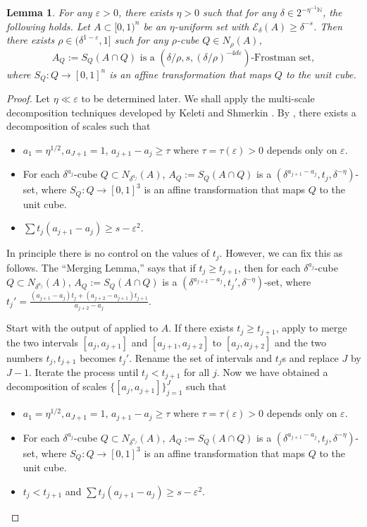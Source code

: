 \documentclass[letterpaper, reqno,11pt]{article}
\numberwithin{equation}{section}
\newcommand{\cP}{A}
\newcommand{\cE}{\mathcal{E}}
\newcommand{\eps}{\varepsilon}
\numberwithin{thm}{section}
\newtheorem{lem}[thm]{Lemma}
\theoremstyle{remark}
\begin{document}
\begin{lem}\label{lem: spacing}
    For any $\eps>0$,  there exists $\eta>0$ such that for any $\delta\in 2^{-\eta^{-1}\mathbb{N}}$, the following holds. Let   $\cP\subset [0,1)^n$ be an $\eta$-uniform set with $\cE_{\delta}(\cP)\geq \delta^{-s}$. Then  there exists $\rho\in (\delta^{1-\eps}, 1]$ such for any  $\rho$-cube $Q\in N_{\rho}(\cP)$, 
    \[
     \cP_Q:= S_Q(\cP\cap Q) \text{ is a } (\delta/\rho, s, (\delta/\rho)^{-4d\eps})\text{-Frostman set},
    \]
    where $S_Q: Q\rightarrow [0,1]^n$ is an affine transformation that maps $Q$ to the unit cube.  
\end{lem}
\begin{proof}
Let $\eta\ll \eps$ to be determined later. 
We shall apply the  multi-scale decomposition techniques developed by Keleti and Shmerkin \cite{KS}. By \cite[Lemma 5.21]{ShmerkinWang}, there exists a decomposition of scales such that 
\begin{itemize}
    \item $a_1=\eta^{1/2}, a_{J+1}=1$, $a_{j+1}-a_j\geq \tau$ where $\tau=\tau(\eps)>0$ depends only on $\eps$. 
    \item For each $\delta^{a_j}$-cube $Q\subset N_{\delta^{a_j}}(\cP)$, $\cP_Q:= S_Q(\cP\cap Q)$ is a $(\delta^{a_{j+1}-a_j}, t_j, \delta^{-\eta})$-set, where $S_Q:Q\rightarrow [0,1]^3$ is an affine transformation that maps $Q$ to the unit cube. 
    \item $\sum t_j(a_{j+1}-a_j) \geq s-\eps^2$. 
\end{itemize}
In principle there is no control on the values of $t_j$. However, we can fix this as follows. The ``Merging Lemma,'' \cite[Lemma 5.20]{ShmerkinWang} says that if $t_j\geq t_{j+1}$, then for  each $\delta^{a_j}$-cube $Q\subset N_{\delta^{a_j}}(\cP)$, $\cP_Q:= S_Q(\cP\cap Q)$ is a $(\delta^{a_{j+2}-a_j}, t_j', \delta^{-\eta})$-set, where $t_j'= \frac{(a_{j+1}-a_j)t_j+ (a_{j+2}-a_{j+1})t_{j+1}}{a_{j+2}-a_j}.$  

Start with the output of \cite[Lemma 5.21]{ShmerkinWang} applied to $\cP$. If there exists $t_j\geq t_{j+1}$, apply \cite[Lemma 5.20]{ShmerkinWang} to merge the two intervals $[a_j, a_{j+1}]$ and $[a_{j+1}, a_{j+2}]$ to $[a_j, a_{j+2}]$ and the two numbers $t_j, t_{j+1}$ becomes $t_j'$.  Rename the set of intervals and $t_j$s and replace $J$ by $J-1$. Iterate the process until $t_j<t_{j+1}$  for all $j$. Now we have obtained a  decomposition of scales $\{[a_j, a_{j+1}]\}_{j=1}^J$ such that 
\begin{itemize}
    \item $a_1=\eta^{1/2}, a_{J+1}=1$, $a_{j+1}-a_j\geq \tau$ where $\tau=\tau(\eps)>0$ depends only on $\eps$. 
    \item For each $\delta^{a_j}$-cube $Q\subset N_{\delta^{a_j}}(\cP)$, $\cP_Q:= S_Q(\cP\cap Q)$ is a $(\delta^{a_{j+1}-a_j}, t_j, \delta^{-\eta})$-set, where $S_Q:Q\rightarrow [0,1]^3$ is an affine transformation that maps $Q$ to the unit cube. 
    \item $t_j<t_{j+1}$ and $\sum t_j(a_{j+1}-a_j) \geq s-\eps^2$. 
\end{itemize}


\end{proof}
\end{document}
